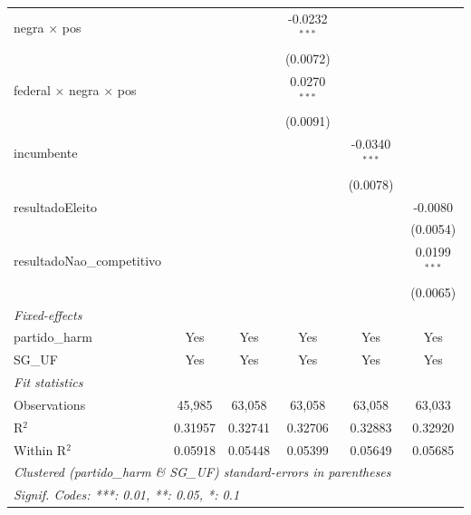 \begin{tabular}{lccccc}
   negra $\times$ pos                        &                       &                 & -0.0232$^{***}$ &                    &   \\   
                                             &                       &                 & (0.0072)        &                    &   \\   
   federal $\times$ negra $\times$ pos       &                       &                 & 0.0270$^{***}$  &                    &   \\   
                                             &                       &                 & (0.0091)        &                    &   \\   
   incumbente                                &                       &                 &                 & -0.0340$^{***}$    &   \\   
                                             &                       &                 &                 & (0.0078)           &   \\   
   resultadoEleito                           &                       &                 &                 &                    & -0.0080\\   
                                             &                       &                 &                 &                    & (0.0054)\\   
   resultadoNao\_competitivo                 &                       &                 &                 &                    & 0.0199$^{***}$\\   
                                             &                       &                 &                 &                    & (0.0065)\\   
   \midrule
   \emph{Fixed-effects}\\
   partido\_harm                             & Yes                   & Yes             & Yes             & Yes                & Yes\\  
   SG\_UF                                    & Yes                   & Yes             & Yes             & Yes                & Yes\\  
   \midrule
   \emph{Fit statistics}\\
   Observations                              & 45,985                & 63,058          & 63,058          & 63,058             & 63,033\\  
   R$^2$                                     & 0.31957               & 0.32741         & 0.32706         & 0.32883            & 0.32920\\  
   Within R$^2$                              & 0.05918               & 0.05448         & 0.05399         & 0.05649            & 0.05685\\  
   \midrule \midrule
   \multicolumn{6}{l}{\emph{Clustered (partido\_harm \& SG\_UF) standard-errors in parentheses}}\\
   \multicolumn{6}{l}{\emph{Signif. Codes: ***: 0.01, **: 0.05, *: 0.1}}\\
\end{tabular}
\par\endgroup


